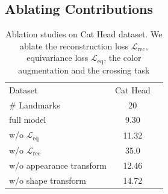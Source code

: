 

	\subsection{Ablating Contributions}\label{sec:ablation}
			\begin{table}
				\centering
				\begin{tabular}{l|cr}
					\hline
					Dataset & Cat Head    \\
					\# Landmarks &  20 \\ \hline
					full model &  9.30 \\ \hline
					w/o $\mathcal{L}_{\textrm{eq}}$   & 11.32 \\
					w/o $\mathcal{L}_{\textrm{rec}}$   & 35.0 \\
					w/o appearance transform & 12.46 \\
					w/o shape transform & 14.72 \\ \hline
				\end{tabular}
				\caption{{Ablation studies on Cat Head dataset. We ablate the reconstruction loss $\mathcal{L}_{\textrm{rec}}$, equivariance loss $\mathcal{L}_{\textrm{eq}}$, the color augmentation and the crossing task}}
				\label{tab:ablation}
			\end{table}


